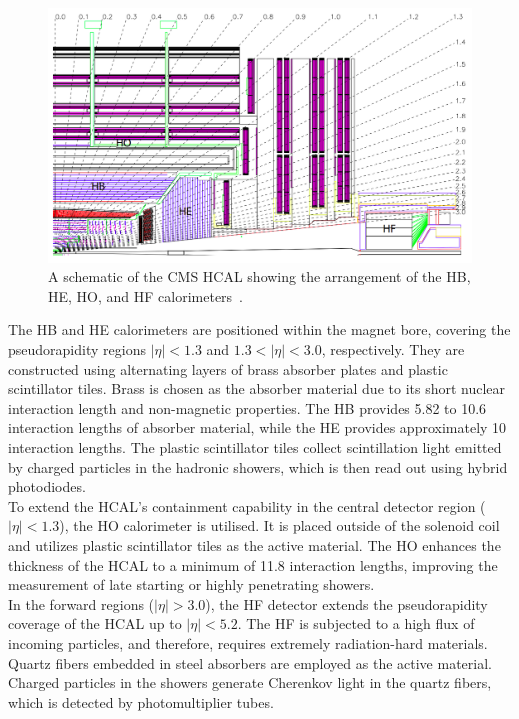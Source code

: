 \begin{figure}[!hbtp]
    \centering
    \includegraphics[width=\textwidth]{Figures/HCAL.png}
    \caption{A schematic of the CMS HCAL showing the arrangement of the HB, HE, HO, and HF calorimeters~\cite{CMS_Setup}.}
    \label{fig:hcal}
\end{figure}

The \ac{HB} and \ac{HE} calorimeters are positioned within the magnet bore, covering the pseudorapidity regions $|\eta| < 1.3$ and $1.3 < |\eta| < 3.0$, respectively. 
They are constructed using alternating layers of brass absorber plates and plastic scintillator tiles. 
Brass is chosen as the absorber material due to its short nuclear interaction length and non-magnetic properties. 
The \ac{HB} provides 5.82 to 10.6 interaction lengths of absorber material, while the HE provides approximately 10 interaction lengths. 
The plastic scintillator tiles collect scintillation light emitted by charged particles in the hadronic showers, which is then read out using hybrid photodiodes. \\

To extend the \ac{HCAL}'s containment capability in the central detector region ($|\eta| < 1.3$), the \ac{HO} calorimeter is utilised. 
It is placed outside of the solenoid coil and utilizes plastic scintillator tiles as the active material. 
The \ac{HO} enhances the thickness of the \ac{HCAL} to a minimum of 11.8 interaction lengths, improving the measurement of late starting or highly penetrating showers. \\

In the forward regions ($|\eta| > 3.0$), the \ac{HF} detector extends the pseudorapidity coverage of the \ac{HCAL} up to $|\eta| < 5.2$. 
The \ac{HF} is subjected to a high flux of incoming particles, and therefore, requires extremely radiation-hard materials. 
Quartz fibers embedded in steel absorbers are employed as the active material. Charged particles in the showers generate Cherenkov light in the quartz fibers, which is detected by photomultiplier tubes. \\

